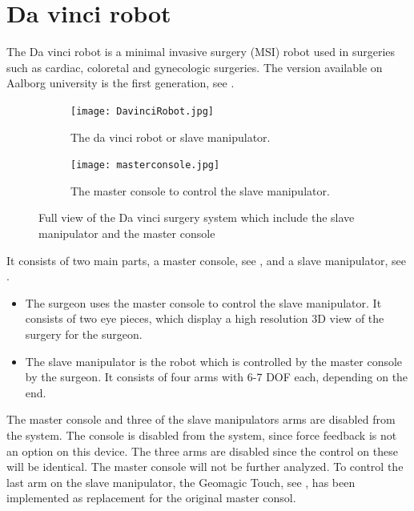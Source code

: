 \section{Da vinci robot}\label{sec:da_vin_rob}

The Da vinci robot is a minimal invasive surgery (MSI) robot used in surgeries such as cardiac, coloretal and gynecologic surgeries\cite{daVinciSurgery}. The version available on Aalborg university is the first generation, see .

\begin{figure}[H]
	\centering
	\begin{subfigure}{.45\textwidth}
		\centering
		\texttt{[image: DavinciRobot.jpg]}
		\caption{The da vinci robot or slave manipulator.}
		\label{fig:davincirobot}
	\end{subfigure}
	\begin{subfigure}{.45\textwidth}
		\centering
		\vspace{12pt}
		\texttt{[image: masterconsole.jpg]}
		\caption{The master console to control the slave manipulator.}
		\label{fig:mastermani}
	\end{subfigure}
\caption{Full view of the Da vinci surgery system which include the slave manipulator and the master console}
\label{fig:fulldavinci}
\end{figure}

It consists of two main parts, a master console, see , and a slave manipulator, see .

\begin{itemize}
\item The surgeon uses the master console to control the slave manipulator. It consists of two eye pieces, which display a high resolution 3D view of the surgery for the surgeon. 
\item The slave manipulator is the robot which is controlled by the master console by the surgeon. It consists of four arms with 6-7 \gls{DOF} each, depending on the end.
\end{itemize}

The master console and three of the slave manipulators arms are disabled from the system. The console is disabled from the system, since force feedback is not an option on this device. The three arms are disabled since the control on these will be identical. The master console will not be further analyzed. To control the last arm on the slave manipulator, the Geomagic Touch, see , has been implemented as replacement for the original master consol.

